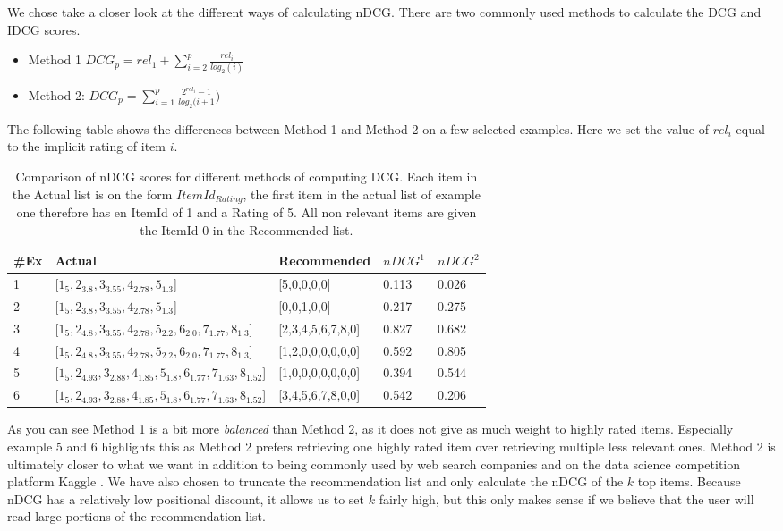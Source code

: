 We chose take a closer look at the different ways of calculating nDCG. There are two commonly used methods to calculate the DCG and IDCG scores.

\begin{itemize}
\item Method 1  $DCG_p = rel_1 + \sum_{i=2}^{p} \frac{rel_i}{log_2(i)}$
\item Method 2: $DCG_p = \sum_{i=1}^{p} \frac{2^{rel_i}-1}{log_2(i+1})$
\end{itemize}

The following table shows the differences between Method 1 and Method 2 on a few selected examples. Here we set the value of $rel_i$ equal to the implicit rating of item $i$.

\begin{table}[H]
\label{table:ndcgfinal}
\centering
\begin{tabular}{*{5}l}
\toprule
\#Ex & 	Actual																	& 	Recommended				&	$nDCG^1$  	   & $nDCG^2$	\\ \midrule
1 		& 	[$1_{5}, 2_{3.8}, 3_{3.55}, 4_{2.78},5_{1.3}$]								&	[5,0,0,0,0]				&	0.113 		   & 0.026  \\ 
2 		& 	[$1_{5}, 2_{3.8}, 3_{3.55}, 4_{2.78},5_{1.3}$]								&	[0,0,1,0,0]				&	0.217 		   & 0.275   \\ 
3   	& 	[$1_{5},2_{4.8}, 3_{3.55}, 4_{2.78}, 5_{2.2}, 6_{2.0},7_{1.77},8_{1.3}$]		&	[2,3,4,5,6,7,8,0]		&	0.827		   & 0.682   \\ 
4  		& 	[$1_{5},2_{4.8}, 3_{3.55}, 4_{2.78}, 5_{2.2}, 6_{2.0},7_{1.77},8_{1.3}$]		&	[1,2,0,0,0,0,0,0]		&	0.592 		   & 0.805   \\
5 		& 	[$1_{5},2_{4.93},3_{2.88}, 4_{1.85},5_{1.8},6_{1.77}, 7_{1.63},8_{1.52}$]	&	[1,0,0,0,0,0,0,0]		&	0.394 		   & 0.544   \\
6 		& 	[$1_{5},2_{4.93},3_{2.88}, 4_{1.85},5_{1.8},6_{1.77}, 7_{1.63},8_{1.52}$]	&	[3,4,5,6,7,8,0,0]		&	0.542 		   & 0.206   \\
\bottomrule
\end{tabular}
\caption{Comparison of nDCG scores for different methods of computing DCG. Each item in the Actual list is on the form $ItemId_{Rating}$, the first item in the actual list of example one therefore has en ItemId of 1 and a Rating of 5. All non relevant items are given the ItemId 0 in the Recommended list.}
\end{table}

As you can see Method 1 is a bit more \emph{balanced} than Method 2, as it does not give as much weight to highly rated items. Especially example 5 and 6 highlights this as Method 2 prefers retrieving one highly rated item over retrieving multiple less relevant ones. Method 2 is ultimately closer to what we want in addition to being commonly used by web search companies and on the data science competition platform Kaggle \cite{kaggle}. We have also chosen to truncate the recommendation list and only calculate the nDCG of the $k$ top items. Because nDCG has a relatively low positional discount, it allows us to set $k$ fairly high, but this only makes sense if we believe that the user will read large portions of the recommendation list. 

